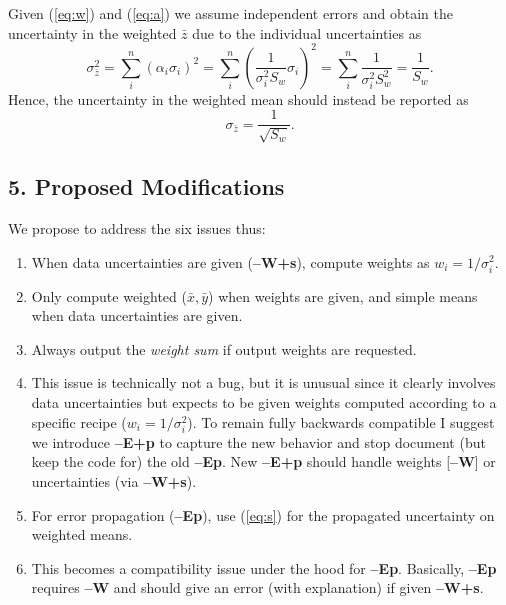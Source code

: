 \documentclass[12pt,letterpaper,margin=0.5in]{report}
\begin{document}
Given (\ref{eq:w}) and (\ref{eq:a}) we assume independent errors and obtain the uncertainty in the weighted $\bar{z}$ due to the individual uncertainties as
\begin{equation}
	\sigma_{\bar{z}}^2 = \sum_i^n \left (\alpha_i \sigma_i \right )^2 = \sum_i^n \left (\frac{1}{\sigma_i^2 S_w} \sigma_i \right )^2 = \sum_i^n \frac{1}{\sigma_i^2 S_w^2} = \frac{1}{S_w}.
	\label{eq:v}
\end{equation}
Hence, the uncertainty in the weighted mean should instead be reported as
\begin{equation}
	\sigma_{\bar{z}} = \frac{1}{\sqrt{S_w}}.
	\label{eq:s}
\end{equation}

\subsection*{5. Proposed Modifications}

We propose to address the six issues thus:
\begin{enumerate}
	\item When data uncertainties are given ({\bf --W+s}), compute weights as $w_i = 1/\sigma_i^2$.
	\item Only compute weighted ($\bar{x}, \bar{y}$) when weights are given, and simple means when data uncertainties are given.
	\item Always output the \emph{weight sum} if output weights are requested.
	\item This issue is technically not a bug, but it is unusual since it clearly involves data uncertainties but expects to be
		given weights computed according to a specific recipe ($w_i = 1/\sigma_i^2$).  To remain fully backwards compatible I
		suggest we introduce {\bf --E+p} to capture the new behavior and stop document (but keep the code for) the old {\bf --Ep}.
		New {\bf --E+p} should handle weights [{\bf --W}] or uncertainties (via {\bf --W+s}).
	\item For error propagation ({\bf --Ep}), use (\ref{eq:s}) for the propagated uncertainty on weighted means.
	\item This becomes a compatibility issue under the hood for {\bf --Ep}.  Basically, {\bf --Ep} requires {\bf --W} and should give
		an error (with explanation) if given {\bf --W+s}.
\end{enumerate}
\end{document}
